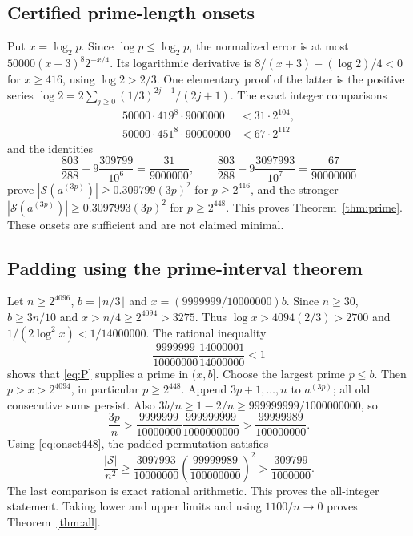 \documentclass[10pt]{amsart}
\theoremstyle{remark}
\newcommand{\Sset}{\mathcal S}
\begin{document}
\subsection{Certified prime-length onsets}
Put $x=\log_2p$. Since $\log p\le\log_2p$, the normalized error is
at most $50000(x+3)^8 2^{-x/4}$.
Its logarithmic derivative is $8/(x+3)-(\log2)/4<0$ for $x\ge416$,
using $\log2>2/3$. One elementary proof of the latter is the positive
series $\log2=2\sum_{j\ge0}(1/3)^{2j+1}/(2j+1)$.
The exact integer comparisons
\begin{align}
 50000\cdot419^8\cdot9000000&<31\cdot2^{104},\label{eq:onset416}\\
 50000\cdot451^8\cdot90000000&<67\cdot2^{112}\label{eq:onset448}
\end{align}
and the identities
\[
 \frac{803}{288}-9\frac{309799}{10^6}=\frac{31}{9000000},\qquad
 \frac{803}{288}-9\frac{3097993}{10^7}=\frac{67}{90000000}
\]
prove $|\Sset(a^{(3p)})|\ge0.309799(3p)^2$ for $p\ge2^{416}$,
and the stronger $|\Sset(a^{(3p)})|\ge0.3097993(3p)^2$ for
$p\ge2^{448}$. This proves Theorem~\ref{thm:prime}.
These onsets are sufficient and are not claimed minimal.

\subsection{Padding using the prime-interval theorem}
Let $n\ge2^{4096}$, $b=\lfloor n/3\rfloor$ and
$x=(9999999/10000000)b$. Since $n\ge30$,
$b\ge3n/10$ and $x>n/4\ge2^{4094}>3275$.
Thus $\log x>4094(2/3)>2700$ and
$1/(2\log^2x)<1/14000000$. The rational inequality
\[
 \frac{9999999}{10000000}\frac{14000001}{14000000}<1
\]
shows that \eqref{eq:P} supplies a prime in $(x,b]$.
Choose the largest prime $p\le b$. Then $p>x>2^{4094}$, in particular
$p\ge2^{448}$. Append $3p+1,\ldots,n$ to $a^{(3p)}$; all old
consecutive sums persist. Also
$3b/n\ge1-2/n\ge999999999/1000000000$, so
\[
 \frac{3p}{n}>
 \frac{9999999}{10000000}\frac{999999999}{1000000000}
 >\frac{99999989}{100000000}.
\]
Using \eqref{eq:onset448}, the padded permutation satisfies
\begin{equation}\label{eq:paddingfinal}
 \frac{|\Sset|}{n^2}\ge
 \frac{3097993}{10000000}\left(\frac{99999989}{100000000}\right)^2
 >\frac{309799}{1000000}.
\end{equation}
The last comparison is exact rational arithmetic. This proves the
all-integer statement. Taking lower and upper limits and using
$1100/n\to0$ proves Theorem~\ref{thm:all}.
\end{document}
